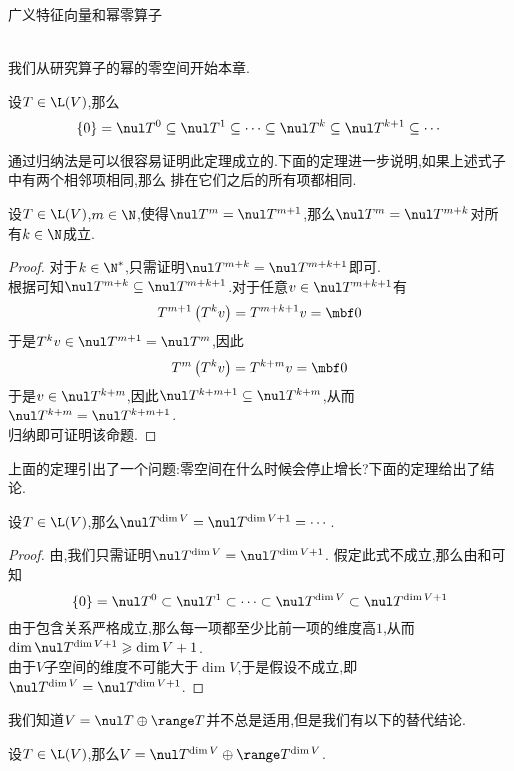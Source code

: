 \documentclass{ctexart}
\begin{document}
\pagestyle{empty}
\begin{center}\large 广义特征向量和幂零算子\end{center}
\\
我们从研究算子的幂的零空间开始本章.
\begin{formal}[1.1 递增的零空间序列]
    设$T\in\L(V)$,那么
    \[\{0\}=\nul T^0\subseteq\nul T^1\subseteq\cdots\subseteq\nul T^k\subseteq\nul T^{k+1}\subseteq\cdots\]
\end{formal}\noindent
通过归纳法是可以很容易证明此定理成立的.下面的定理进一步说明,如果上述式子中有两个相邻项相同,那么%
排在它们之后的所有项都相同.
\begin{formal}[1.2 零空间序列中的等式]
    设$T\in\L(V)$,$m\in\N$,使得$\nul T^m=\nul T^{m+1}$,那么$\nul T^m=\nul T^{m+k}$对所有$k\in\N$成立.
\end{formal}
\begin{proof}
    对于$k\in\N^*$,只需证明$\nul T^{m+k}=\nul T^{m+k+1}$即可.\\
    根据可知$\nul T^{m+k}\subseteq\nul T^{m+k+1}$.对于任意$v\in \nul T^{m+k+1}$有
    \[T^{m+1}\left(T^kv\right)=T^{m+k+1}v=\mbf0\]
    于是$T^{k}v\in\nul T^{m+1}=\nul T^{m}$,因此
    \[T^{m}\left(T^{k}v\right)=T^{k+m}v=\mbf0\]
    于是$v\in\nul T^{k+m}$,因此$\nul T^{k+m+1}\subseteq\nul T^{k+m}$,从而$\nul T^{k+m}=\nul T^{k+m+1}$.\\
    归纳即可证明该命题.
\end{proof}\noindent
上面的定理引出了一个问题:零空间在什么时候会停止增长?下面的定理给出了结论.
\begin{formal}[1.3 零空间停止增长]
    设$T\in\L(V)$,那么$\nul T^{\dim V}=\nul T^{\dim V+1}=\cdots$.
\end{formal}
\begin{proof}
    由,我们只需证明$\nul T^{\dim V}=\nul T^{\dim V+1}$.%
    假定此式不成立,那么由和可知
    \[\{0\}=\nul T^0\subset\nul T^1\subset\cdots\subset\nul T^{\dim V}\subset\nul T^{\dim V+1}\]
    由于包含关系严格成立,那么每一项都至少比前一项的维度高$1$,从而$\dim\nul T^{\dim V+1}\geqslant\dim V+1$.\\
    由于$V$子空间的维度不可能大于$\dim V$,于是假设不成立,即$\nul T^{\dim V}=\nul T^{\dim V+1}$.
\end{proof}\noindent
我们知道$V=\nul T\oplus\range T$并不总是适用,但是我们有以下的替代结论.
\begin{formal}[1.4 $V$的直和分解]
    设$T\in\L(V)$,那么$V=\nul T^{\dim V}\oplus\range T^{\dim V}$.
\end{formal}
\end{document}
